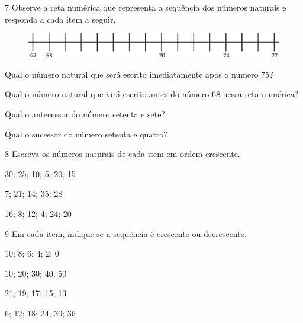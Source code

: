 \num{7} Observe a reta numérica que representa a sequência dos números naturais e responda a cada item a seguir.

\begin{figure}[htpb!]
\includegraphics[width=\textwidth]{./media/image31.png}
\end{figure}

\begin{escolha}
\item Qual o número natural que será escrito imediatamente após o número 75?

\item Qual o número natural que virá escrito antes do número 68 nessa reta numérica?

\item Qual o antecessor do número setenta e sete?
\reduline{76\hfill}

\item Qual o sucessor do número setenta e quatro?
\reduline{75\hfill}
\end{escolha}

\num{8} Escreva os números naturais de cada item em ordem crescente.

\begin{escolha}
\item 30; 25; 10; 5; 20; 15

\item 7; 21; 14; 35; 28

\item 16; 8; 12; 4; 24; 20
\end{escolha}

\num{9} Em cada item, indique se a sequência é crescente ou decrescente.

\begin{escolha}
\item 10; 8; 6; 4; 2; 0

\item 10; 20; 30; 40; 50

\item 21; 19; 17; 15; 13

\item 6; 12; 18; 24; 30; 36
\end{escolha}

